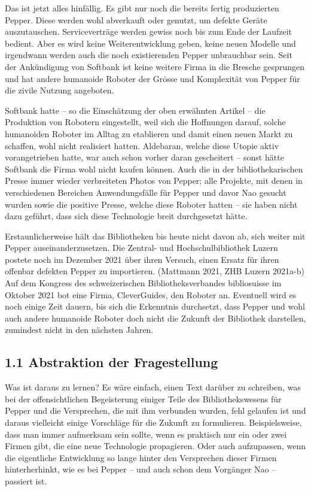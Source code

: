 \documentclass[a4paper,
fontsize=11pt,
oneside,
numbers=noperiodatend,
parskip=half-,
bibliography=totoc,
final
]{scrartcl}
\begin{document}
Das ist jetzt alles hinfällig. Es gibt nur noch die bereits fertig
produzierten Pepper. Diese werden wohl abverkauft oder genutzt, um
defekte Geräte auszutauschen. Serviceverträge werden gewiss noch bis zum
Ende der Laufzeit bedient. Aber es wird keine Weiterentwicklung geben,
keine neuen Modelle und irgendwann werden auch die noch existierenden
Pepper unbrauchbar sein. Seit der Ankündigung von Softbank ist keine
weitere Firma in die Bresche gesprungen und hat andere humanoide Roboter
der Grösse und Komplexität von Pepper für die zivile Nutzung angeboten.

Softbank hatte -- so die Einschätzung der oben erwähnten Artikel -- die
Produktion von Robotern eingestellt, weil sich die Hoffnungen darauf,
solche humanoiden Roboter im Alltag zu etablieren und damit einen neuen
Markt zu schaffen, wohl nicht realisiert hatten. Aldebaran, welche diese
Utopie aktiv vorangetrieben hatte, war auch schon vorher daran
gescheitert -- sonst hätte Softbank die Firma wohl nicht kaufen können.
Auch die in der bibliothekarischen Presse immer wieder verbreiteten
Photos von Pepper; alle Projekte, mit denen in verschiedenen Bereichen
Anwendungsfälle für Pepper und davor Nao gesucht wurden sowie die
positive Presse, welche diese Roboter hatten -- sie haben nicht dazu
geführt, dass sich diese Technologie breit durchgesetzt hätte.

Erstaunlicherweise hält das Bibliotheken bis heute nicht davon ab, sich
weiter mit Pepper auseinanderzusetzen. Die Zentral- und
Hochschulbibliothek Luzern postete noch im Dezember 2021 über ihren
Versuch, einen Ersatz für ihren offenbar defekten Pepper zu importieren.
(Mattmann 2021, ZHB Luzern 2021a-b) Auf dem Kongress des schweizerischen
Bibliotheksverbandes bibliosuisse im Oktober 2021 bot eine Firma,
CleverGuides, den Roboter an. Eventuell wird es noch einige Zeit dauern,
bis sich die Erkenntnis durchsetzt, dass Pepper und wohl auch andere
humanoide Roboter doch nicht die Zukunft der Bibliothek darstellen,
zumindest nicht in den nächsten Jahren.

\hypertarget{abstraktion-der-fragestellung}{%
\subsection{1.1 Abstraktion der
Fragestellung}\label{abstraktion-der-fragestellung}}

Was ist daraus zu lernen? Es wäre einfach, einen Text darüber zu
schreiben, was bei der offensichtlichen Begeisterung einiger Teile des
Bibliothekswesens für Pepper und die Versprechen, die mit ihm verbunden
wurden, fehl gelaufen ist und daraus vielleicht einige Vorschläge für
die Zukunft zu formulieren. Beispielsweise, dass man immer aufmerksam
sein sollte, wenn es praktisch nur ein oder zwei Firmen gibt, die eine
neue Technologie propagieren. Oder auch aufzupassen, wenn die
eigentliche Entwicklung so lange hinter den Versprechen dieser Firmen
hinterherhinkt, wie es bei Pepper -- und auch schon dem Vorgänger Nao --
passiert ist.
\end{document}
